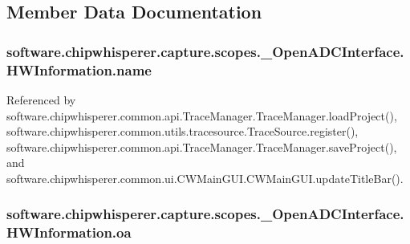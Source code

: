 \subsection{Member Data Documentation}
\hypertarget{classsoftware_1_1chipwhisperer_1_1capture_1_1scopes_1_1__OpenADCInterface_1_1HWInformation_a68537335bcac877714b67e69d2fc6bc0}{}
\subsubsection[{name}]{\setlength{\rightskip}{0pt plus 5cm}software.\+chipwhisperer.\+capture.\+scopes.\+\_\+\+Open\+A\+D\+C\+Interface.\+H\+W\+Information.\+name}\label{classsoftware_1_1chipwhisperer_1_1capture_1_1scopes_1_1__OpenADCInterface_1_1HWInformation_a68537335bcac877714b67e69d2fc6bc0}


Referenced by software.\+chipwhisperer.\+common.\+api.\+Trace\+Manager.\+Trace\+Manager.\+load\+Project(), software.\+chipwhisperer.\+common.\+utils.\+tracesource.\+Trace\+Source.\+register(), software.\+chipwhisperer.\+common.\+api.\+Trace\+Manager.\+Trace\+Manager.\+save\+Project(), and software.\+chipwhisperer.\+common.\+ui.\+C\+W\+Main\+G\+U\+I.\+C\+W\+Main\+G\+U\+I.\+update\+Title\+Bar().

\hypertarget{classsoftware_1_1chipwhisperer_1_1capture_1_1scopes_1_1__OpenADCInterface_1_1HWInformation_a10e3d20fa6064a5f32791c5bc518f6c5}{}
\subsubsection[{oa}]{\setlength{\rightskip}{0pt plus 5cm}software.\+chipwhisperer.\+capture.\+scopes.\+\_\+\+Open\+A\+D\+C\+Interface.\+H\+W\+Information.\+oa}\label{classsoftware_1_1chipwhisperer_1_1capture_1_1scopes_1_1__OpenADCInterface_1_1HWInformation_a10e3d20fa6064a5f32791c5bc518f6c5}


